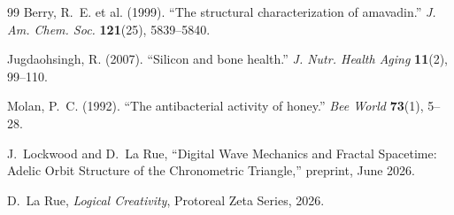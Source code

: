 \vspace{2em}
\begin{thebibliography}{99}
Berry, R.~E. et al. (1999).
``The structural characterization of amavadin.''
\textit{J. Am. Chem. Soc.} \textbf{121}(25), 5839--5840.

Jugdaohsingh, R. (2007).
``Silicon and bone health.''
\textit{J. Nutr. Health Aging} \textbf{11}(2), 99--110.

Molan, P.~C. (1992).
``The antibacterial activity of honey.''
\textit{Bee World} \textbf{73}(1), 5--28.

J.~Lockwood and D.~La Rue, ``Digital Wave Mechanics and Fractal Spacetime: Adelic Orbit Structure of the Chronometric Triangle,'' preprint, June 2026.

D.~La Rue, \emph{Logical Creativity}, Protoreal Zeta Series, 2026.

\end{thebibliography}
